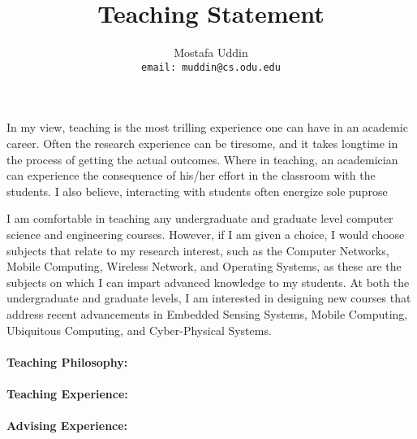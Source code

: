 \documentclass[12pt]{amsart}
\title{Teaching Statement}
\author{Mostafa Uddin\\\texttt{email: muddin@cs.odu.edu}}
\begin{document}
\maketitle
In my view, teaching is the most trilling experience one can have in an academic career. Often the research experience can be tiresome, and it takes longtime in the process of getting the actual outcomes. Where in teaching, an academician can experience the consequence of his/her effort in the classroom with the students. I also believe, interacting with students often energize  
sole puprose 

I am comfortable in teaching any undergraduate and graduate level computer science and engineering courses. However, if I am
given a choice, I would choose subjects that relate to my research interest, such as the Computer Networks, Mobile Computing, Wireless Network, and Operating Systems, as these are the subjects on which I can impart advanced knowledge to my students. At
both the undergraduate and graduate levels, I am interested in designing new courses that address recent advancements in
Embedded Sensing Systems, Mobile Computing, Ubiquitous Computing, and Cyber-Physical Systems.
\\
\\
\textbf{Teaching Philosophy:}
\\
\\
\textbf{Teaching Experience:}
\\
\\
\textbf{Advising Experience:}

\end{document}

